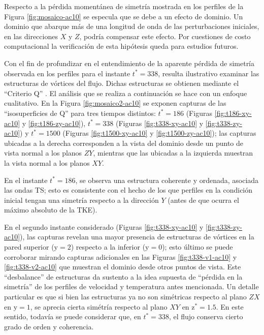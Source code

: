 Respecto a la pérdida momentánea de simetría mostrada en los perfiles de la Figura \ref{fig:mosaico-ac10}  se especula que se debe a un efecto de dominio. Un dominio que abarque más de una longitud de onda de las perturbaciones iniciales, en las direcciones $X$ y $Z$, podría compensar este efecto. Por cuestiones de costo computacional la verificación de esta hipótesis queda para estudios futuros.

Con el fin de profundizar en el entendimiento de la aparente pérdida de simetría observada en los perfiles para el instante $t^* = 338$, resulta ilustrativo examinar las estructuras de vórtices del flujo. Dichas estructuras se obtienen mediante el ``Criterio Q'' \cite{hunt1988eddies}. El análisis que se realiza a continuación se hace con un enfoque cualitativo. En la Figura \ref{fig:mosaico2-ac10} se exponen capturas de las ``isosuperficies de Q'' para tres tiempos distintos: $t^* = 186$ (Figuras \ref{fig:t186-xy-ac10} y  \ref{fig:t186-zy-ac10}),  $t^* = 338$  (Figuras \ref{fig:t338-xy-ac10} y  \ref{fig:t338-zy-ac10}) y  $t^* = 1500$  (Figuras \ref{fig:t1500-xy-ac10} y  \ref{fig:t1500-zy-ac10}); las capturas ubicadas a la derecha corresponden a la vista del dominio desde un punto de vista normal a los planos $ZY$, mientras que las ubicadas a la izquierda muestran la vista normal a los planos $XY$.

En el instante $t^* = 186$, se observa una estructura coherente y ordenada, asociada las ondas TS; esto es consistente con el hecho de los que perfiles en la condición inicial tengan una simetría respecto a la dirección $Y$ (antes de que ocurra el máximo absoluto de la TKE). 

En el segundo instante considerado (Figuras \ref{fig:t338-xy-ac10} y \ref{fig:t338-zy-ac10}), las capturas revelan una mayor presencia de estructuras de vórtices en la pared superior ($\text{y}=2$) respecto a la inferior ($\text{y}=0$); esto último se puede corroborar mirando capturas adicionales en las Figuras \ref{fig:t338-v1-ac10} y \ref{fig:t338-v2-ac10} que muestran el dominio desde otros puntos de vista. Este ``desbalance'' de estructuras da sustento a la idea supuesta de ``pérdida en la simetría'' de los perfiles de velocidad y temperatura antes mencionada. Un detalle particular es que si bien las estructuras ya no son simétricas respecto al plano $ZX$ en $\text{y}=1$, se aprecia cierta simétría respecto al plano $XY$ en $\text{z}^*= 1\text{.}5$. En este sentido, todavía se puede considerar que, en $t^* = 338$, el flujo conserva cierto grado de orden y coherencia. 


